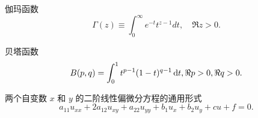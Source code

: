 \documentclass{njustexam}
\begin{document}
伽玛函数
\begin{equation*}
  \Gamma(z) \equiv \int_{0}^{\infty} e^{-t} t^{z-1} d t, \quad \Re z>0 .
\end{equation*}

贝塔函数
\begin{equation*}
    B(p, q) = \int_0^1 t^{p -1} (1-t)^{q-1} \mathop{}\!\mathrm{d} t, \Re p> 0, \Re q >0.
    \label{eq:beta_def1}
\end{equation*}

两个自变数 $x$ 和 $y$ 的二阶线性偏微分方程的通用形式
\begin{equation*}
    a_{11} u_{x x}+2 a_{12} u_{x y}+a_{22} u_{y y}+b_1 u_x+b_2 u_y+c u+f=0.
    \label{eq:two_variable_diff_equation}
\end{equation*}
\end{document}
